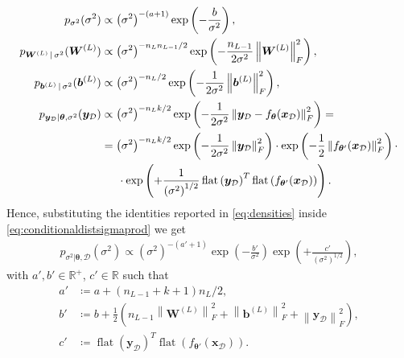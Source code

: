 \documentclass[a4paper, 11pt, reqno]{amsart}
\theoremstyle{plain}
\theoremstyle{remark}
\theoremstyle{definition}
\newcommand{\given}{\, | \,}
\newcommand{\real}{\mathbb{R}}
\newcommand{\norm}[1]{\left\lVert#1\right\rVert}
\renewcommand{\exp}[1]{\operatorname{exp}\left(#1\right)}
\newcommand{\flatten}[1]{\operatorname{flat}\left(#1\right)}
\newcommand{\blankeq}{\kern14.65pt}
\newcommand{\train}{\mathcal{D}}
\begin{document}
\begin{equation} \label{eq:densities}
	\begin{aligned}
		p_{\sigma^2}(\sigma^2) & \propto \left(\sigma^2\right)^{-(a + 1)} \exp{-\frac{b}{\sigma^2}}, \\
		p_{\bm{W}^{(L)} \given \sigma^2}(\bm{W}^{(L)}) & \propto \left(\sigma^2\right)^{-n_{L} n_{L - 1} / 2} \exp{-\frac{n_{L - 1}}{2 \sigma^2} \norm{\bm{W}^{(L)}}^2_F}, \\
		p_{\bm{b}^{(L)} \given \sigma^2}(\bm{b}^{(L)}) & \propto \left(\sigma^2\right)^{-n_{L}/2} \exp{-\frac{1}{2 \sigma^2} \norm{\bm{b}^{(L)}}^2_F}, \\
		p_{\bm{y}_{\mathcal{D}} | \bm{\theta}, \sigma^2}(\bm{y}_{\mathcal{D}}) & \propto \left(\sigma^2\right)^{-n_L k/ 2} \exp{-\frac{1}{2\sigma^2} \norm{\bm{y}_{\mathcal{D}} - f_{\bm{\theta}}(\bm{x}_{\mathcal{D}})}_F^2} = \\
		& = \left(\sigma^2\right)^{-n_L k / 2} \exp{-\frac{1}{2 \sigma^2} \norm{\bm{y}_{\mathcal{D}}}_F^2} \cdot \exp{-\frac{1}{2} \norm{f_{\bm{\theta}'}(\bm{x}_{\mathcal{D}})}_F^2} \cdot \\
		& \blankeq \cdot \exp{+\frac{1}{\left(\sigma^2\right)^{1/2}} \flatten{\bm{y}_{\mathcal{D}}}^T \flatten{f_{\bm{\theta}'}(\bm{x}_{\mathcal{D}})}}.
	\end{aligned}
\end{equation}
Hence, substituting the identities reported in \cref{eq:densities} inside \cref{eq:conditionaldistsigmaprod} we get
\begin{equation} \label{eq:conditionaldistsigma}
	\begin{aligned}
		p_{\sigma^2 | \bm{\theta}, \train}(\sigma^2) \propto \left(\sigma^2\right)^{-(a' + 1)} \exp{-\frac{b'}{\sigma^2}} \exp{+\frac{c'}{\left(\sigma^2\right)^{1/2}}},
	\end{aligned}
\end{equation}
with $a', b' \in \real^+$, $c' \in \real$ such that
\begin{equation*}
	\begin{aligned}
		a' & \coloneqq a + (n_{L - 1} + k + 1) n_L / 2, \\
		b' & \coloneqq b + \frac{1}{2} \left(n_{L - 1} \norm{\bm{W}^{(L)}}^2_F + \norm{\bm{b}^{(L)}}^2_F + \norm{\bm{y}_{\mathcal{D}}}_F^2\right), \\
		c' & \coloneqq \flatten{\bm{y}_{\mathcal{D}}}^T \flatten{f_{\bm{\theta}'}(\bm{x}_{\mathcal{D}})}.
	\end{aligned}
\end{equation*}
\end{document}
